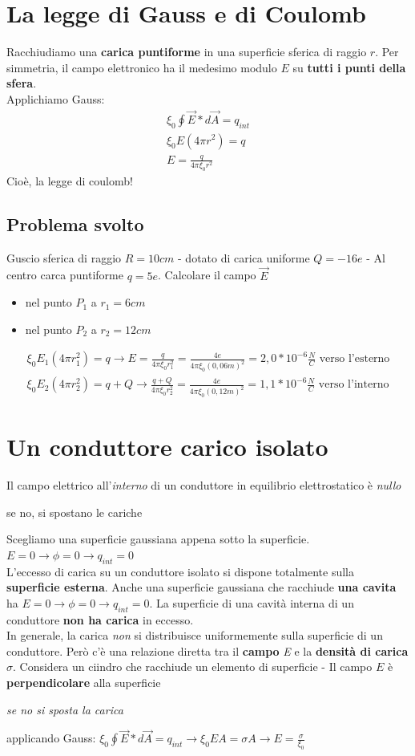 \section{La legge di Gauss e di Coulomb}
Racchiudiamo una \textbf{carica puntiforme} in una superficie sferica di raggio $r$.
Per simmetria, il campo elettronico ha il medesimo modulo $E$ su \textbf{tutti i punti della sfera}.\\
Applichiamo Gauss:
\begin{eqnarray*}
  \xi_0\oint \vec{E}*d\vec{A}=q_{int}\\
  \xi_0 E(4\pi r^2) = q\\
  E=\frac{q}{4\pi\xi_0r^2}
\end{eqnarray*}
Cioè, la legge di coulomb!
\subsection{Problema svolto}
Guscio sferica di raggio $R=10cm$ - dotato di carica uniforme $Q=-16e$ - Al centro carca puntiforme $q=5e$. Calcolare il campo $\vec{E}$
\begin{itemize}
\item nel punto $P_1$ a $r_1=6cm$
\item nel punto $P_2$ a $r_2=12cm$
\end{itemize}
\begin{eqnarray*}
  \xi_0 E_1(4\pi r_1^2)=q\to E=\frac{q}{4\pi \xi_0 r^2_1}=\frac{4e}{4\pi \xi_0 (0,06m)^2}=2,0*10^{-6}\frac{N}{C} \text{ verso l'esterno}\\
  \xi_0 E_2 (4\pi r^2_2)=q+Q\to \frac{q+Q}{4\pi \xi_0 r^2_2}=\frac{4e}{4\pi \xi_0 (0,12m)^2}=1,1 *10^{-6}\frac{N}{C} \text{ verso l'interno}
\end{eqnarray*}
\section{Un conduttore carico isolato}
Il campo elettrico all'\textit{interno} di un conduttore in equilibrio elettrostatico è \textit{nullo}
\begin{center}
	se no, si spostano le cariche
\end{center}
Scegliamo una superficie gaussiana appena sotto la superficie. $E=0\to \phi=0\to q_{int}=0$\\
L'eccesso di carica su un conduttore isolato si dispone totalmente sulla
\textbf{superficie esterna}. Anche una superficie gaussiana che racchiude \textbf{una cavita} ha
$E=0 \to \phi=0\to q_{int}=0$. La superficie di una cavità interna di un conduttore \textbf{non ha carica} in eccesso.\\
In generale, la carica \textit{non} si distribuisce uniformemente sulla superficie di un conduttore. Però c'è una relazione diretta tra il \textbf{campo} \textit{E} e la \textbf{densità di carica} $\sigma$. Considera un ciindro che racchiude un elemento di superficie - Il campo $E$ è
\textbf {perpendicolare} alla superficie
\begin{center}
	{\it se no si sposta la carica}
\end{center}
applicando Gauss: $\xi_0 \oint \vec{E}*d\vec{A}=q_{int}\to \xi_0EA=\sigma A \to E=\frac{\sigma}{\xi_0}$
